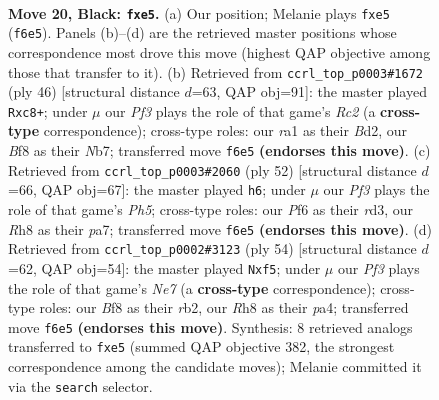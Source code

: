 \documentclass[11pt]{article}
\begin{document}
\clearpage

\begin{figure}[p]\centering
\begin{subfigure}{0.46\textwidth}\centering
\resizebox{\linewidth}{!}{%
\newchessgame
\chessboard[
  setfen={rk3b1r/pp5p/5p2/4PP2/PPP5/2n5/8/R1B1KB1R b KQ - 0 20},
  showmover=false,
  pgfstyle=straightmove, color=movearrow, markmove={f6-e5}
]}
\caption{}
\end{subfigure}\hfill
\begin{subfigure}{0.46\textwidth}\centering
\resizebox{\linewidth}{!}{%
\newchessgame
\chessboard[
  setfen={r1r3k1/1N2bpp1/3p4/3n4/P4P2/5p2/1PRB2PP/R5K1 w - - 1 24},
  showmover=false,
  pgfstyle=straightmove, color=movearrow, markmove={c2-c8}
]}
\caption{}
\end{subfigure}
\\[4pt]
\begin{subfigure}{0.46\textwidth}\centering
\resizebox{\linewidth}{!}{%
\newchessgame
\chessboard[
  setfen={5rk1/p2b3p/6p1/7P/5p2/3r2P1/PR3PB1/4R1K1 w - - 0 27},
  showmover=false,
  pgfstyle=straightmove, color=movearrow, markmove={h5-h6}
]}
\caption{}
\end{subfigure}\hfill
\begin{subfigure}{0.46\textwidth}\centering
\resizebox{\linewidth}{!}{%
\newchessgame
\chessboard[
  setfen={7k/4Npbp/8/r4p2/p1pPP3/P7/1r3P1P/R4RK1 w - - 2 28},
  showmover=false,
  pgfstyle=straightmove, color=movearrow, markmove={e7-f5}
]}
\caption{}
\end{subfigure}
\caption{\textbf{Move 20, Black: \texttt{fxe5}.} (a) Our position; Melanie plays \texttt{fxe5} (\texttt{f6e5}). Panels (b)--(d) are the retrieved master positions whose correspondence most drove this move (highest QAP objective among those that transfer to it). (b) Retrieved from \texttt{ccrl\_top\_p0003\#1672} (ply 46) [structural distance $d$=63, QAP obj=91]: the master played \texttt{Rxc8+}; under $\mu$ our \emph{Pf3} plays the role of that game's \emph{Rc2} (a \textbf{cross-type} correspondence); cross-type roles: our \emph{r}a1 as their \emph{B}d2, our \emph{B}f8 as their \emph{N}b7; transferred move \texttt{f6e5} \textbf{(endorses this move)}. (c) Retrieved from \texttt{ccrl\_top\_p0003\#2060} (ply 52) [structural distance $d$=66, QAP obj=67]: the master played \texttt{h6}; under $\mu$ our \emph{Pf3} plays the role of that game's \emph{Ph5}; cross-type roles: our \emph{P}f6 as their \emph{r}d3, our \emph{R}h8 as their \emph{p}a7; transferred move \texttt{f6e5} \textbf{(endorses this move)}. (d) Retrieved from \texttt{ccrl\_top\_p0002\#3123} (ply 54) [structural distance $d$=62, QAP obj=54]: the master played \texttt{Nxf5}; under $\mu$ our \emph{Pf3} plays the role of that game's \emph{Ne7} (a \textbf{cross-type} correspondence); cross-type roles: our \emph{B}f8 as their \emph{r}b2, our \emph{R}h8 as their \emph{p}a4; transferred move \texttt{f6e5} \textbf{(endorses this move)}. Synthesis: 8 retrieved analogs transferred to \texttt{fxe5} (summed QAP objective 382, the strongest correspondence among the candidate moves); Melanie committed it via the \texttt{search} selector.}
\label{fig:thought-m39}
\end{figure}
\end{document}
